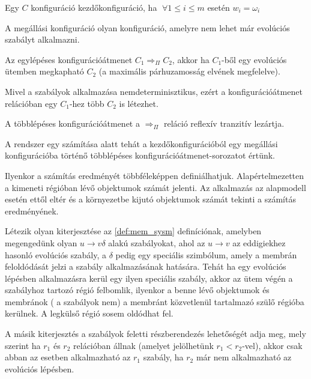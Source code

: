 \begin{note}
Egy $C$ konfiguráció kezdőkonfiguráció, ha $ \; \forall 1 \leq i \leq m$ esetén $w_i = \omega_i$
\end{note}

\begin{definition}
A megállási konfiguráció olyan konfiguráció, amelyre nem lehet már evolúciós szabályt alkalmazni.
\end{definition}

\begin{definition}
Az egylépéses konfigurációátmenet $C_1 \Longrightarrow_\Pi C_2$, akkor ha $C_1$-ből egy evolúciós ütemben megkapható $C_2$ (a maximális párhuzamosság elvének megfelelve). 
\end{definition}

\begin{note}
Mivel a szabályok alkalmazása nemdeterminisztikus, ezért a konfigurációátmenet relációban egy $C_1$-hez több $C_2$ is létezhet.
\end{note}

\begin{definition}
A többlépéses konfigurációátmenet a $\Longrightarrow_\Pi$ reláció reflexív tranzitív lezártja. 
\end{definition}

A rendszer egy számítása alatt tehát a kezdőkonfigurációból egy megállási konfigurációba történő többlépéses konfigurációátmenet-sorozatot értünk.

\begin{note}
Ilyenkor a számítás eredményét többféleképpen definiálhatjuk. Alapértelmezetten a kimeneti régióban lévő objektumok számát jelenti. Az alkalmazás az alapmodell esetén ettől eltér és a környezetbe kijutó objektumok számát tekinti a számítás eredményének.
\end{note}

Létezik olyan kiterjesztése az \ref{def:mem_sysm} definíciónak, amelyben megengedünk olyan $u \rightarrow v \delta$ alakú szabályokat, ahol az $u \rightarrow v$ az eddigiekhez hasonló evolúciós szabály, a $\delta$ pedig egy speciális szimbólum, amely a membrán feloldódását jelzi a szabály alkalmazásának hatására. Tehát ha egy evolúciós lépésben alkalmazásra kerül egy ilyen speciális szabály, akkor az ütem végén a szabályhoz tartozó régió felbomlik, ilyenkor a benne lévő objektumok és membránok ( a szabályok nem) a membránt közvetlenül tartalmazó szülő régióba kerülnek. A legkülső régió sosem oldódhat fel. 

A másik kiterjesztés a szabályok feletti részberendezés lehetőségét adja meg, mely szerint ha $r_1$ és $r_2$ relációban állnak (amelyet jelölhetünk $r_1 < r_2$-vel), akkor csak abban az esetben alkalmazható az $r_1$ szabály, ha $r_2$ már nem alkalmazható az evolúciós lépésben.

